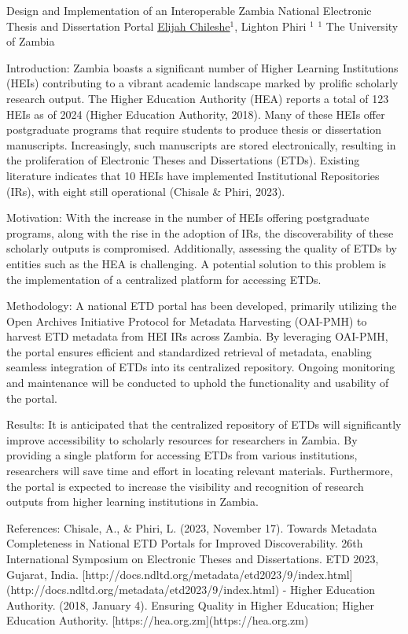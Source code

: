 \begin{abstract_online}{Design and Implementation of an Interoperable Zambia National Electronic Thesis and Dissertation Portal}{%
    \underline{Elijah Chileshe}$^{1}$, Lighton Phiri $^{1}$}{%
    }{%
    $^1$ The University of Zambia}
    
    Introduction: Zambia boasts a significant number of Higher Learning Institutions (HEIs) contributing to a vibrant academic landscape marked by prolific scholarly research output. The Higher Education Authority (HEA) reports a total of 123 HEIs as of 2024 (Higher Education Authority, 2018). Many of these HEIs offer postgraduate programs that require students to produce thesis or dissertation manuscripts. Increasingly, such manuscripts are stored electronically, resulting in the proliferation of Electronic Theses and Dissertations (ETDs). Existing literature indicates that 10 HEIs have implemented Institutional Repositories (IRs), with eight still operational (Chisale & Phiri, 2023).

    Motivation: With the increase in the number of HEIs offering postgraduate programs, along with the rise in the adoption of IRs, the discoverability of these scholarly outputs is compromised. Additionally, assessing the quality of ETDs by entities such as the HEA is challenging. A potential solution to this problem is the implementation of a centralized platform for accessing ETDs.

    Methodology: A national ETD portal has been developed, primarily utilizing the Open Archives Initiative Protocol for Metadata Harvesting (OAI-PMH) to harvest ETD metadata from HEI IRs across Zambia. By leveraging OAI-PMH, the portal ensures efficient and standardized retrieval of metadata, enabling seamless integration of ETDs into its centralized repository. Ongoing monitoring and maintenance will be conducted to uphold the functionality and usability of the portal.

 	Results: It is anticipated that the centralized repository of ETDs will significantly improve accessibility to scholarly resources for researchers in Zambia. By providing a single platform for accessing ETDs from various institutions, researchers will save time and effort in locating relevant materials. Furthermore, the portal is expected to increase the visibility and recognition of research outputs from higher learning institutions in Zambia.

	References: Chisale, A., & Phiri, L. (2023, November 17). Towards Metadata Completeness in National ETD Portals for Improved Discoverability. 26th International Symposium on Electronic Theses and Dissertations. ETD 2023, Gujarat, India. [http://docs.ndltd.org/metadata/etd2023/9/index.html](http://docs.ndltd.org/metadata/etd2023/9/index.html)
    - Higher Education Authority. (2018, January 4). Ensuring Quality in Higher Education; Higher Education Authority. [https://hea.org.zm](https://hea.org.zm)

\end{abstract_online}

